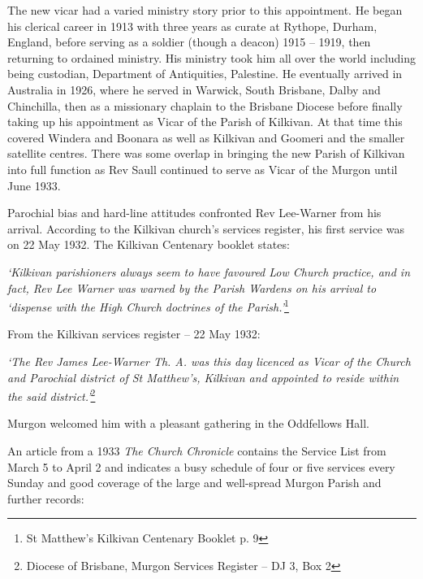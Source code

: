 The new vicar had a varied ministry story prior to this appointment. He began his clerical career in 1913 with three years as curate at Rythope, Durham, England, before serving as a soldier (though a deacon) 1915 -- 1919, then returning to ordained ministry. His ministry took him all over the world including being custodian, Department of Antiquities, Palestine. He eventually arrived in Australia in 1926, where he served in Warwick, South Brisbane, Dalby and Chinchilla, then as a missionary chaplain to the Brisbane Diocese before finally taking up his appointment as Vicar of the Parish of Kilkivan. At that time this covered Windera and Boonara as well as Kilkivan and Goomeri and the smaller satellite centres. There was some overlap in bringing the new Parish of Kilkivan into full function as Rev Saull continued to serve as Vicar of the Murgon until June 1933.



Parochial bias and hard-line attitudes confronted Rev Lee-Warner from his arrival. According to the Kilkivan church's services register, his first service was on 22 May 1932. The Kilkivan Centenary booklet states:



\emph{`Kilkivan parishioners always seem to have favoured Low Church practice, and in fact, Rev Lee Warner was warned by the Parish Wardens on his arrival to `dispense with the High Church doctrines of the Parish.'}\footnote{St Matthew's Kilkivan Centenary Booklet p. 9}


From the Kilkivan services register -- 22 May 1932:



\emph{`The Rev James Lee-Warner Th. A. was this day licenced as Vicar of the Church and Parochial district of St Matthew's, Kilkivan and appointed to reside within the said district.'}\footnote{Diocese of Brisbane, Murgon Services Register -- DJ 3, Box 2}


Murgon welcomed him with a pleasant gathering in the Oddfellows Hall.



An article from a 1933 \emph{The Church Chronicle} contains the Service List from March 5 to April 2 and indicates a busy schedule of four or five services every Sunday and good coverage of the large and well-spread Murgon Parish and further records:



